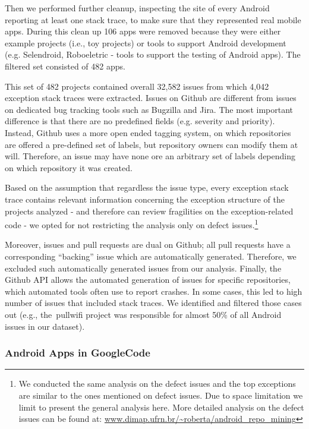 \documentclass[conference]{IEEEtran}
\begin{document}
Then we performed further cleanup, inspecting the site of every Android
reporting at least one stack trace, to make sure that they represented real
mobile apps. During this clean up 106 apps were removed because they were either
example projects (i.e., toy projects) or tools to support Android development
(e.g. Selendroid, Roboeletric - tools to support the testing of Android apps).
The filtered set consisted of 482 apps. 


This set of 482 projects contained overall 32,582 issues from which 4,042 exception stack traces 
were extracted. Issues on Github are different from issues on dedicated bug tracking tools such as 
Bugzilla and Jira. The most important difference is that there are no predefined fields
  (e.g. severity and priority). Instead, Github uses a more open ended tagging system, on which
repositories are offered a pre-defined set of labels, but repository owners can modify 
them at will. Therefore, an issue may have none ore an arbitrary set of labels depending 
on which repository it was created. 

Based on the assumption that regardless the issue type, every exception stack
trace contains relevant information concerning the exception structure of the
projects analyzed - and therefore can review fragilities on the exception-related code -  
we opted for not restricting the analysis only on defect
issues.\footnote{We conducted the same analysis on the defect issues and the top
exceptions are similar to the ones mentioned on defect issues. Due to space
limitation we limit to present the general analysis here. More detailed analysis
on the defect issues can be found at:
\url{www.dimap.ufrn.br/~roberta/android_repo_mining}}

Moreover, issues and pull requests are dual on Github; all pull requests have a corresponding 
``backing'' issue which are automatically generated. Therefore, we excluded such automatically generated
issues from our analysis. Finally, the Github API allows the automated
generation of issues for specific repositories, which automated tools often use
to report crashes. In some cases, this led to high number of issues that
included stack traces. We identified and filtered those cases out (e.g.,
the~\textsf{pullwifi} project was responsible for almost 50\% of all Android issues in our dataset).

\subsubsection{Android Apps in GoogleCode}
\end{document}
